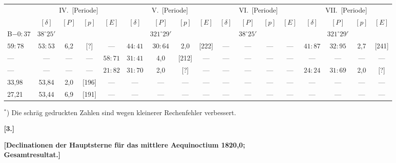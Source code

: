 \documentclass[12pt,a4paper]{article}
\theoremstyle{plain}
\theoremstyle{definition}
\theoremstyle{remark}
\begin{document}
\medskip
{\small
\begin{center}
\begin{tabular}{l|c c c c | c c c c | c c c c | c c c c}
\toprule
& \multicolumn{4}{c|}{IV.\ [Periode]} & \multicolumn{4}{c|}{V.\ [Periode]} & \multicolumn{4}{c|}{VI.\ [Periode]} & \multicolumn{4}{c}{VII.\ [Periode]} \\
& $[\delta]$ & $[P]$ & $[p]$ & $[E]$ & $[\delta]$ & $[P]$ & $[p]$ & $[E]$ & $[\delta]$ & $[P]$ & $[p]$ & $[E]$ & $[\delta]$ & $[P]$ & $[p]$ & $[E]$ \\
\midrule
B$-0\!\!:\!\!37$ & $38^\circ 25'$ & & & & & $321^\circ 29'$ & & & & $38^\circ 25'$ & & & & $321^\circ 29'$ & & \\
$59\!\!:\!\!78$ & $53\!\!:\!\!53$ & 6,2 & [?] & --- & $44\!\!:\!\!41$ & $30\!\!:\!\!64$ & 2,0 & [222] & --- & --- & --- & --- & $41\!\!:\!\!87$ & $32\!\!:\!\!95$ & 2,7 & [241] \\
--- & --- & --- & --- & $58\!\!:\!\!71$ & $31\!\!:\!\!41$ & 4,0 & [212] & --- & --- & --- & --- & --- & --- & --- & --- & --- \\
--- & --- & --- & --- & $21\!\!:\!\!82$ & $31\!\!:\!\!70$ & 2,0 & [?] & --- & --- & --- & --- & --- & $24\!\!:\!\!24$ & $31\!\!:\!\!69$ & 2,0 & [?] \\
33,98 & 53,84 & 2,0 & [196] & --- & --- & --- & --- & --- & --- & --- & --- & --- & --- & --- & --- & --- \\
27,21 & 53,44 & 6,9 & [191] & --- & --- & --- & --- & --- & --- & --- & --- & --- & --- & --- & --- & --- \\
\bottomrule
\end{tabular}
\end{center}
}

\smallskip
$^*$) Die schr\"{a}g gedruckten Zahlen sind wegen kleinerer Rechenfehler verbessert.

\newpage
\begin{center}
\textbf{[3.]}
\end{center}

\begin{center}
\textbf{[Declinationen der Hauptsterne f\"{u}r das mittlere Aequinoctium 1820,0;}\\
\textbf{Gesamtresultat.]}
\end{center}
\end{document}

